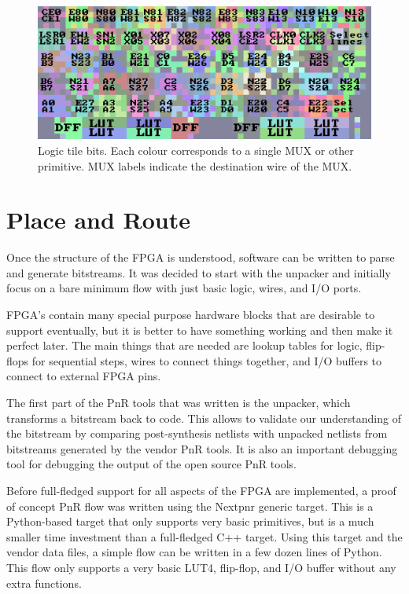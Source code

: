 \documentclass{article}
\begin{document}
\begin{figure}
    \centering
    \includegraphics[width=\textwidth]{fig/tile.png}
    \caption{Logic tile bits. Each colour corresponds to a single MUX or other primitive. MUX labels indicate the destination wire of the MUX.}
    \label{fig:bits}
\end{figure}


\section{Place and Route}

Once the structure of the FPGA is understood, software can be written to parse and generate bitstreams. It was decided to start with the unpacker and initially focus on a bare minimum flow with just basic logic, wires, and I/O ports.

FPGA's contain many special purpose hardware blocks that are desirable to support eventually, but it is better to have something working and then make it perfect later. The main things that are needed are lookup tables for logic, flip-flops for sequential steps, wires to connect things together, and I/O buffers to connect to external FPGA pins.

The first part of the PnR tools that was written is the unpacker, which transforms a bitstream back to code. This allows to validate our understanding of the bitstream by comparing post-synthesis netlists with unpacked netlists from bitstreams generated by the vendor PnR tools. It is also an important debugging tool for debugging the output of the open source PnR tools.

Before full-fledged support for all aspects of the FPGA are implemented, a proof of concept PnR flow was written using the Nextpnr generic target. This is a Python-based target that only supports very basic primitives, but is a much smaller time investment than a full-fledged C++ target. Using this target and the vendor data files, a simple flow can be written in a few dozen lines of Python. This flow only supports a very basic LUT4, flip-flop, and I/O buffer without any extra functions.
\end{document}

